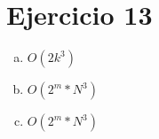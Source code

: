 \documentclass{article}
\begin{document}
\section*{Ejercicio 13}




\begin{enumerate}[a)]
    \item $O(2k^{3})$
    \item $O(2^m*N^{3})$
    \item $O(2^m*N^{3})$
\end{enumerate}
\end{document}
